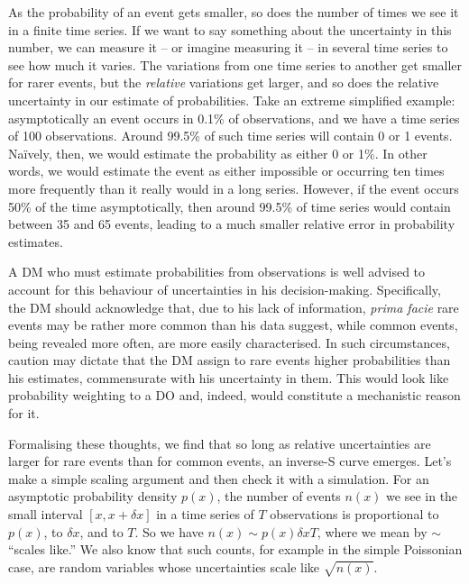 \documentclass[a4paper, 12pt]{article}
\begin{document}
As the probability of an event gets smaller, so does the number of times we see it in a finite time series. If we want to say something about the uncertainty in this number, we can measure it -- or imagine measuring it -- in several time series to see how much it varies. The variations from one time series to another get smaller for rarer events, but the {\it relative} variations get larger, and so does the relative uncertainty in our estimate of probabilities. Take an extreme simplified example: asymptotically an event occurs in 0.1\% of observations, and we have a time series of 100 observations. %
Around 99.5\% of such time series will contain 0 or 1 events. Na\"{i}vely, then, we would estimate the probability as either 0 or 1\%. In other words, we would estimate the event as either impossible or occurring ten times more frequently than it really would in a long series. However, if the event occurs 50\% of the time asymptotically, then around 99.5\% of time series would contain between 35 and 65 events, leading to a much smaller relative error in probability estimates.

A DM who must estimate probabilities from observations is well advised to account for this behaviour of uncertainties in his decision-making. Specifically, the DM should acknowledge that, due to his lack of information, {\it prima facie} rare events may be rather more common than his data suggest, while common events, being revealed more often, are more easily characterised. In such circumstances, caution may dictate that the DM assign to rare events higher probabilities than his estimates, commensurate with his uncertainty in them. This would look like probability weighting to a DO and, indeed, would constitute a mechanistic reason for it.

Formalising these thoughts, we find that so long as relative uncertainties are larger for rare events than for common events, an inverse-S curve emerges. 
Let's make a simple scaling argument and then check it with a simulation. For an asymptotic probability density $p(x)$, the number of events $n(x)$ we see in the small interval $[x, x+ \delta x]$ in a time series of $T$ observations is proportional to $p(x)$, to $\delta x$, and to $T$. So we have $n(x) \sim p(x) \delta x T$, where we mean by $\sim$ ``scales like.'' We also know that such counts, for example in the simple Poissonian case, are random variables whose uncertainties scale like $\sqrt{n(x)}$.
\end{document}
